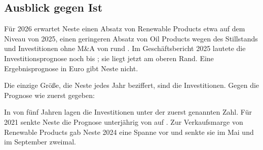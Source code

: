 \subsection{Ausblick gegen Ist}

F\"ur 2026 erwartet Neste einen Absatz von Renewable Products etwa auf dem Niveau von 2025,
einen geringeren Absatz von Oil Products wegen des Stillstands und Investitionen ohne M\&A von
rund . Im Gesch\"aftsbericht 2025 lautete die
Investitionsprognose noch \je{\ProgXXVIVon}{} bis ;
sie liegt jetzt am oberen Rand. Eine Ergebnisprognose in Euro gibt Neste nicht.

Die einzige Gr\"o{\ss}e, die Neste jedes Jahr beziffert, sind die Investitionen. Gegen die
Prognose wie zuerst gegeben:

\prognosetabelle

In \PrognoseUnter{} von f\"unf Jahren lagen die Investitionen unter der zuerst genannten
Zahl. F\"ur 2021 senkte Neste die Prognose unterj\"ahrig von \je{\ProgXXI}{} auf
. Zur Verkaufsmarge von Renewable Products
gab Neste 2024 eine Spanne vor und senkte sie im Mai und im September zweimal.
